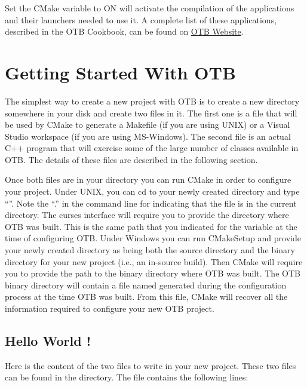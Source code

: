 Set the CMake variable  to ON will activate the compilation of the applications and their launchers needed to use it. A complete list of these applications, described in the OTB Cookbook, can be found on \href{http://orfeo-toolbox.org/Applications/index.html}{OTB Website}.



\section{Getting Started With OTB }
\label{sec:GettingStartedWithOTB}

The simplest way to create a new project with OTB is to create a new directory
somewhere in your disk and create two files in it. The first one is a
 file that will be used by CMake to generate a Makefile
(if you are using UNIX) or a Visual Studio workspace (if you are using
MS-Windows).  The second file is an actual C++ program that will exercise
some of the large number of classes available in OTB. The details of these files
are described in the following section.

Once both files are in your directory you can run CMake in order to configure
your project. Under UNIX, you can cd to your newly created directory
and type ``''. Note the ``.'' in the command line for indicating
that the  file is in the current directory. The
curses interface will require you to provide the directory where OTB
was built. This is the same path that you indicated for the
 variable at the time of configuring OTB. Under
Windows you can run CMakeSetup and provide your newly created
directory as being both the source directory and the binary directory for
your new project (i.e., an in-source build). Then CMake will require you to
provide the path to the binary directory where OTB was built. The OTB binary
directory will contain a file named  generated during the
configuration process at the time OTB was built.  From this file, CMake will
recover all the information required to configure your new OTB project.


\subsection{Hello World !}
\label{sec:HelloWorldOTB}


Here is the content of the two files to write in your new project. These two
files can be found in the  directory. The
 file contains the following lines:

